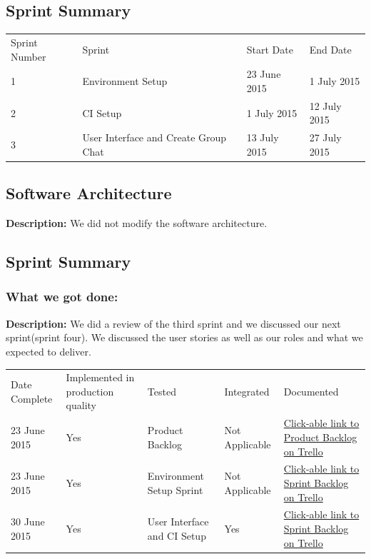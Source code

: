 \documentclass[a4paper]{article}
\begin{document}
\subsection{Sprint Summary}
\setlength{\arrayrulewidth}{0.5mm}
\setlength{\tabcolsep}{12pt}
\renewcommand{\arraystretch}{2} 
\begin{tabular}{ |p{2.5cm}|p{2.5cm}|p{2.5cm} |p{2.5cm}| }
\hline
\rowcolor{lightgray}\multicolumn{4}{|c|}{Sprint Summary} \\
\hline
Sprint Number & Sprint & Start Date & End Date\\
\hline 
1 & Environment Setup & 23 June 2015 & 1 July 2015 \\
\hline
2 & CI Setup & 1 July 2015 & 12 July 2015 \\
\hline
3 & User Interface  and Create Group Chat & 13 July 2015 & 27 July 2015 \\
\hline

\end{tabular}

\subsection{Software Architecture}
\textbf{Description: }We did not modify the software architecture. \\

\subsection{Sprint Summary}
\subsubsection{What we got done: }
\textbf{Description: }We did a review of the third sprint and we discussed our next sprint(sprint four). We discussed the user stories as well as our roles and what we expected to deliver. \\

\setlength{\arrayrulewidth}{0.5mm}
\setlength{\tabcolsep}{12pt}
\renewcommand{\arraystretch}{2} 
\begin{tabular}{ |p{2.5cm}|p{2.5cm}|p{2.5cm}|p{2.5cm}| p{2.5cm}| }
\hline
\rowcolor{lightgray} \multicolumn{5}{|c|}{Completed Work} \\
\hline
Date Complete & Implemented in production quality & Tested & Integrated & Documented\\
\hline 
23 June 2015 & Yes & Product Backlog & Not Applicable & \href{https://trello.com/b/FtBs3HX1}{Click-able link to Product Backlog on Trello}\\ \hline
23 June 2015 & Yes & Environment Setup Sprint & Not Applicable & \href{https://trello.com/b/hBJF6EUd}{Click-able link to Sprint Backlog on Trello}\\ 
\hline
30 June 2015 & Yes & User Interface and CI Setup & Yes & \href{https://trello.com/b/hBJF6EUd}{Click-able link to Sprint Backlog on Trello}\\ 
\hline
\end{tabular}
\end{document}
